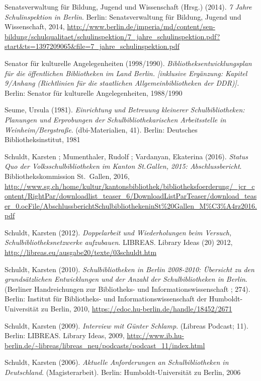 \documentclass[a4paper,
fontsize=11pt,
oneside,
numbers=noperiodatend,
parskip=half-,
bibliography=totoc,
final
]{scrartcl}
\begin{document}
Senatsverwaltung für Bildung, Jugend und Wissenschaft (Hrsg.) (2014).
\emph{7 Jahre Schulinspektion in Berlin}. Berlin: Senatsverwaltung für
Bildung, Jugend und Wissenschaft, 2014,
\url{http://www.berlin.de/imperia/md/content/sen-bildung/schulqualitaet/schulinspektion/7_jahre_schulinspektion.pdf?start\&ts=1397209065\&file=7_jahre_schulinspektion.pdf}

Senator für kulturelle Angelegenheiten (1998/1990).
\emph{Bibliotheksentwicklungsplan für die öffentlichen Bibliotheken im
Land Berlin. {[}inklusive Ergänzung: Kapitel 9/Anhang (Richtlinien für
die staatlichen Allgemeinbibliotheken der DDR){]}.} Berlin: Senator für
kulturelle Angelegenheiten, 1988/1990

Seume, Ursula (1981). \emph{Einrichtung und Betreuung kleinerer
Schulbibliotheken: Planungen und Erprobungen der Schulbibliothekarischen
Arbeitsstelle in Weinheim/Bergstraße}. (dbi-Materialien, 41). Berlin:
Deutsches Bibliotheksinstitut, 1981

Schuldt, Karsten ; Mumenthaler, Rudolf ; Vardanyan, Ekaterina (2016).
\emph{Status Quo der Volksschulbibliotheken im Kanton St.Gallen, 2015:
Abschlussbericht}. Bibliothekskommission St.~Gallen, 2016,
\url{http://www.sg.ch/home/kultur/kantonsbibliothek/bibliotheksfoerderung/_jcr_content/RightPar/downloadlist_teaser_6/DownloadListParTeaser/download_teaser_0.ocFile/AbschlussberichtSchulbibliothekeninSt\%20Gallen_M\%C3\%A4rz2016.pdf}

Schuldt, Karsten (2012). \emph{Doppelarbeit und Wiederholungen beim
Versuch, Schulbibliotheksnetzwerke aufzubauen}. LIBREAS. Library Ideas
(20) 2012, \url{http://libreas.eu/ausgabe20/texte/03schuldt.htm}

Schuldt, Karsten (2010). \emph{Schulbibliotheken in Berlin 2008-2010:
Übersicht zu den grundsätzlichen Entwicklungen und der Anzahl der
Schulbibliotheken in Berlin}. (Berliner Handreichungen zur Bibliotheks-
und Informationswissenschaft ; 274). Berlin: Institut für Bibliotheks-
und Informationswissenschaft der Humboldt-Universität zu Berlin, 2010,
\url{https://edoc.hu-berlin.de/handle/18452/2671}

Schuldt, Karsten (2009). \emph{Interview mit Günter Schlamp}. (Libreas
Podcast; 11). Berlin: LIBREAS. Library Ideas, 2009,
\url{http://www.ib.hu-berlin.de/~libreas/libreas_neu/podcasts/podcast_11/index.html}

Schuldt, Karsten (2006). \emph{Aktuelle Anforderungen an
Schulbibliotheken in Deutschland}. (Magisterarbeit). Berlin:
Humboldt-Universität zu Berlin, 2006
\end{document}
